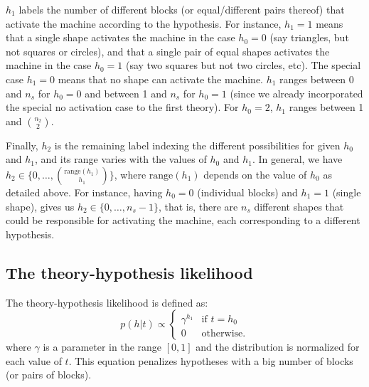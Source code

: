 \documentclass[11pt, a4paper]{article}
\begin{document}
$h_1$ labels the number of different blocks (or equal/different pairs thereof) that activate the machine according to the hypothesis. For instance, $h_1=1$ means that a single shape activates the machine in the case $h_0=0$ (say triangles, but not squares or circles), and that a single pair of equal shapes activates the machine in the case $h_0=1$ (say two squares but not two circles, etc). The special case $h_1=0$ means that no shape can activate the machine. $h_1$ ranges between 0 and $n_s$ for $h_0=0$ and between 1 and $n_s$ for $h_0=1$ (since we already incorporated the special no activation case to the first theory). For $h_0=2$, $h_1$ ranges between 1 and $n_2 \choose 2$.
 
Finally, $h_2$ is the remaining label indexing the different possibilities for given $h_0$ and $h_1$, and its range varies with the values of $h_0$ and $h_1$. In general, we have $h_2\in\{0, \ldots, {\textrm{range}(h_1) \choose h_1 }\}$, where $\textrm{range}(h_1)$ depends on the value of $h_0$ as detailed above. For instance, having $h_0=0$ (individual blocks) and $h_1=1$ (single shape), gives us $h_2\in\{0, \ldots, n_s-1\}$, that is, there are $n_s$ different shapes that could be responsible for activating the machine, each corresponding to a different hypothesis. 
 
\subsection*{The theory-hypothesis likelihood}
The theory-hypothesis likelihood is defined as:
\begin{equation}
p(h|t) \propto
\begin{cases}
\gamma^{h_1} & \mbox{if } t=h_0 \\ 
0 & \mbox{otherwise}.
\end{cases}
\end{equation}
where $\gamma$ is a parameter in the range $[0,1]$ and the distribution is normalized for each value of $t$. This equation penalizes hypotheses with a big number of blocks (or pairs of blocks).
 
\end{document}
